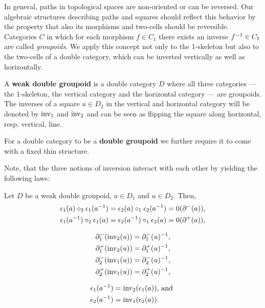 In general, paths in topological spaces are non-oriented or can be reversed.
Our algebraic structures describing paths and squares should reflect this behavior
by the property that also its morphisms and two-cells should be reversible.
Categories $C$ in which for each morphism $f \in C_1$ there exists an inverse
$f^{-1} \in C_1$ are called \emph{groupoids}. We apply this concept not only
to the 1-skeleton but also to the two-cells of a
double category, which can be inverted vertically as well as horizontally.

\begin{defn} \label{def:weak-dbl-gpd}
A \textbf{weak double groupoid} is a double category $D$ where all three categories
--- the 1-skeleton, the vertical category and the horizontal category --- are
groupoids. The inverses of a square $u \in D_2$ in the vertical and horizontal category 
will be denoted by $\operatorname{inv_1}$ and $\operatorname{inv_2}$ and can be seen as flipping the square
along horizontal, resp. vertical, line.

For a double category to be a \textbf{double groupoid} we further require it to
come with a fixed thin structure.
\end{defn}

Note, that the three notions of inversion interact with each other by yielding
the following laws:

\begin{lemma} \label{thm:dbl-gpd-inv} %
Let $D$ be a weak double groupoid, $a \in D_1$ and $u \in D_2$. Then,
\begin{equation} \label{eq:inv-coherence1}
\begin{aligned}
\epsilon_1(a) \circ_2 \epsilon_1(a^{-1})
	&= \epsilon_2(a) \circ_1 \epsilon_2(a^{-1})
	= 0(\partial^-(a)) \text{,} \\
\epsilon_1(a^{-1}) \circ_2 \epsilon_1(a)
	&= \epsilon_2(a^{-1}) \circ_1 \epsilon_2(a)
	= 0(\partial^+(a)) \text{,}
\end{aligned}
\end{equation}

\begin{equation} \label{eq:inv-coherence2}
\begin{aligned}
\partial^-_1(\operatorname{inv_2}(u)) &= \partial^-_1(u)^{-1} \text{,} \\
\partial^+_1(\operatorname{inv_2}(u)) &= \partial^+_1(u)^{-1} \text{,} \\
\partial^-_2(\operatorname{inv_1}(u)) &= \partial^-_2(u)^{-1} \text{,} \\
\partial^+_2(\operatorname{inv_1}(u)) &= \partial^+_2(u)^{-1} \text{,}
\end{aligned}
\end{equation}

\begin{equation} \label{eq:inv-coherence3}
\begin{aligned}
\epsilon_1(a^{-1}) &= \operatorname{inv_2}(\epsilon_1(a)) \text{, and } \\
\epsilon_2(a^{-1}) &= \operatorname{inv_1}(\epsilon_2(a)) \text{.}
\end{aligned}
\end{equation}
\end{lemma}

